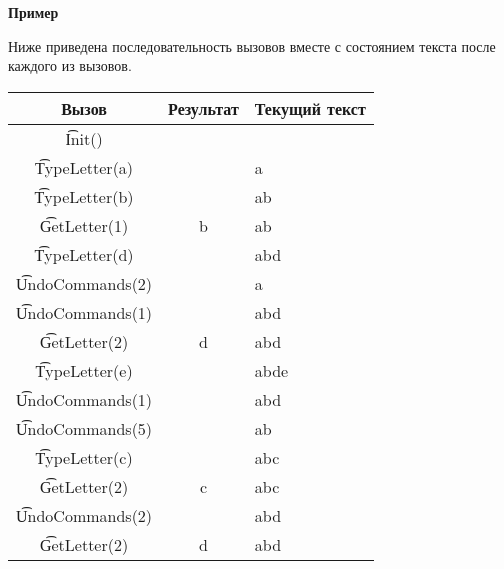 \bf{Пример}

Ниже приведена последовательность вызовов вместе с состоянием текста после каждого из вызовов.

\begin{tabular}{|c|c|l|}\hline
\bf{Вызов}&\bf{Результат}&\bf{Текущий текст}\\\hline
\t{Init()}&&\\\hline
\t{TypeLetter(a)}& &a\\\hline
\t{TypeLetter(b)}& &ab\\\hline
\t{GetLetter(1)}& b &ab\\\hline
\t{TypeLetter(d)}& &abd\\\hline
\t{UndoCommands(2)}& &a\\\hline
\t{UndoCommands(1)}& &abd\\\hline
\t{GetLetter(2)}& d &abd\\\hline
\t{TypeLetter(e)}& &abde\\\hline
\t{UndoCommands(1)}& &abd\\\hline
\t{UndoCommands(5)}& &ab\\\hline
\t{TypeLetter(c)}& &abc\\\hline
\t{GetLetter(2)}& c &abc\\\hline
\t{UndoCommands(2)}& &abd\\\hline
\t{GetLetter(2)}& d &abd\\\hline
\end{tabular}
